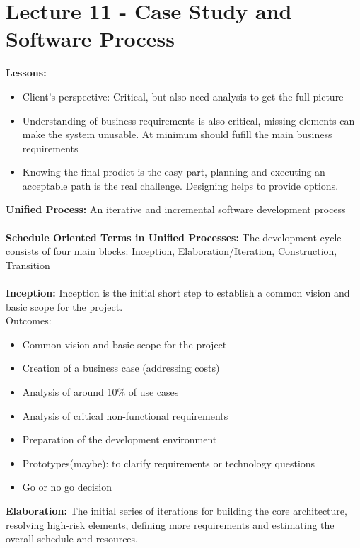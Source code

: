 \documentclass[a4paper,10pt]{article}
\begin{document}
\section*{Lecture 11 - Case Study and Software Process}
\textcolor{Rhodamine}{\textbf{Lessons:}}
\renewcommand{\labelitemi}{\textperiodcentered}
\begin{itemize}
\item Client's perspective: Critical, but also need analysis to get the full picture 
\item Understanding of business requirements is also critical, missing elements can make the system unusable. At minimum should fufill the main business requirements 
\item Knowing the final prodict is the easy part, planning and executing an acceptable path is the real challenge. Designing helps to provide options. 
\end{itemize}
\textcolor{Rhodamine}{\textbf{Unified Process:}} An iterative and incremental software development process\\\\
\textcolor{Rhodamine}{\textbf{Schedule Oriented Terms in Unified Processes:}} The development cycle consists of four main blocks: Inception, Elaboration/Iteration, Construction, Transition\\\\
\textcolor{Rhodamine}{\textbf{Inception:}} Inception is the initial short step to establish a common vision and basic scope for the project. \\
Outcomes:
\renewcommand{\labelitemi}{\textperiodcentered}
\begin{itemize}
\item Common vision and basic scope for the project 
\item Creation of a business case (addressing costs)
\item Analysis of around 10\% of use cases 
\item Analysis of critical non-functional requirements 
\item Preparation of the development environment
\item Prototypes(maybe): to clarify requirements or technology questions 	
\item Go or no go decision 
\end{itemize}
\textcolor{Rhodamine}{\textbf{Elaboration:}} The initial series of iterations for building the core architecture, resolving high-risk elements, defining more requirements and estimating the overall schedule and resources.
\end{document}
